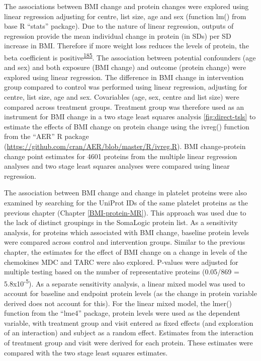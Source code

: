 \documentclass[11pt,twoside]{bristolthesis}
\begin{document}
The associations between BMI change and protein changes were explored using linear regression adjusting for centre, list size, age and sex (function lm() from base R ``stats'' package). Due to the nature of linear regression, outputs of regression provide the mean individual change in protein (in SDs) per SD increase in BMI. Therefore if more weight loss reduces the levels of protein, the beta coefficient is positive\textsuperscript{\protect\hyperlink{ref-Figarska2020}{185}}. The association between potential confounders (age and sex) and both exposure (BMI change) and outcome (protein change) were explored using linear regression. The difference in BMI change in intervention group compared to control was performed using linear regression, adjusting for centre, list size, age and sex. Covariables (age, sex, centre and list size) were compared across treatment groups. Treatment group was therefore used as an instrument for BMI change in a two stage least squares analysis \ref{fig:direct-tsls} to estimate the effects of BMI change on protein change using the ivreg() function from the ``AER'' R package (\url{https://github.com/cran/AER/blob/master/R/ivreg.R}). BMI change-protein change point estimates for 4601 proteins from the multiple linear regression analyses and two stage least squares analyses were compared using linear regression.

The association between BMI change and change in platelet proteins were also examined by searching for the UniProt IDs of the same platelet proteins as the previous chapter (Chapter \ref{BMI-protein-MR}). This approach was used due to the lack of distinct groupings in the SomaLogic protein list. As a sensitivity analysis, for proteins which associated with BMI change, baseline protein levels were compared across control and intervention groups. Similar to the previous chapter, the estimates for the effect of BMI change on a change in levels of the chemokines MDC and TARC were also explored. P-values were adjusted for multiple testing based on the number of representative proteins (0.05/869 = 5.8x10\textsuperscript{-5}). As a separate sensitivity analysis, a linear mixed model was used to account for baseline and endpoint protein levels (as the change in protein variable derived does not account for this). For the linear mixed model, the lmer() function from the ``lme4'' package, protein levels were used as the dependent variable, with treatment group and visit entered as fixed effects (and exploration of an interaction) and subject as a random effect. Estimates from the interaction of treatment group and visit were derived for each protein. These estimates were compared with the two stage least squares estimates.
\end{document}
